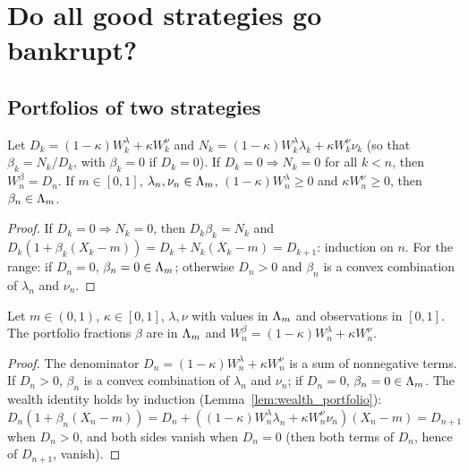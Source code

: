 \chapter{Do all good strategies go bankrupt?}
\label{chap:improve}

\section{Portfolios of two strategies}

\begin{lemma}
  \label{lem:wealth_portfolio}
  \leanok
  Let $D_k = (1-\kappa)W^\lambda_k + \kappa W^\nu_k$ and $N_k = (1-\kappa)W^\lambda_k\lambda_k +
  \kappa W^\nu_k\nu_k$ (so that $\beta_k = N_k / D_k$, with $\beta_k = 0$ if $D_k = 0$). If
  $D_k = 0 \Rightarrow N_k = 0$ for all $k < n$, then $W^\beta_n = D_n$. If $m \in [0,1]$,
  $\lambda_n, \nu_n \in \Lambda_m$, $(1-\kappa)W^\lambda_n \ge 0$ and $\kappa W^\nu_n \ge 0$, then
  $\beta_n \in \Lambda_m$.
\end{lemma}

\begin{proof}
  \leanok
  If $D_k = 0 \Rightarrow N_k = 0$, then $D_k \beta_k = N_k$ and
  $D_k (1 + \beta_k (X_k - m)) = D_k + N_k (X_k - m) = D_{k+1}$: induction on $n$. For the range:
  if $D_n = 0$, $\beta_n = 0 \in \Lambda_m$; otherwise $D_n > 0$ and $\beta_n$ is a convex combination
  of $\lambda_n$ and $\nu_n$.
\end{proof}

\begin{lemma}
  \label{fact:mixture_of_two}
  \leanok
  Let $m \in (0,1)$, $\kappa \in [0, 1]$, $\lambda, \nu$ with values in $\Lambda_m$ and observations in
  $[0,1]$. The portfolio fractions $\beta$ are in $\Lambda_m$ and
  $W^\beta_n = (1 - \kappa) W^\lambda_n + \kappa W^\nu_n$.
\end{lemma}

\begin{proof}
  \leanok
  The denominator $D_n = (1-\kappa)W^\lambda_n + \kappa W^\nu_n$ is a sum of nonnegative terms. If
  $D_n > 0$, $\beta_n$ is a convex combination of $\lambda_n$ and $\nu_n$; if $D_n = 0$, $\beta_n = 0
  \in \Lambda_m$. The wealth identity holds by induction (Lemma~\ref{lem:wealth_portfolio}):
  $D_n (1 + \beta_n (X_n - m)) = D_n + ((1-\kappa)W^\lambda_n\lambda_n + \kappa W^\nu_n\nu_n)(X_n -
  m) = D_{n+1}$ when $D_n > 0$, and both sides vanish when $D_n = 0$ (then both terms of $D_n$, hence
  of $D_{n+1}$, vanish).
\end{proof}

